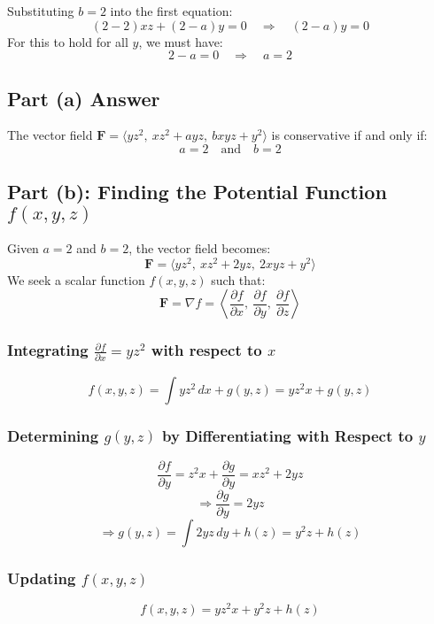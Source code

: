 \documentclass[11pt]{article}
\begin{document}
Substituting \( b = 2 \) into the first equation:
\[
(2 - 2) x z + (2 - a) y = 0 \quad \Rightarrow \quad (2 - a) y = 0
\]
For this to hold for all \( y \), we must have:
\[
2 - a = 0 \quad \Rightarrow \quad a = 2
\]

\newpage

\subsection{Part (a) Answer}

The vector field \( \mathbf{F} = \langle y z^2, \ x z^2 + a y z, \ b x y z + y^2 \rangle \) is conservative if and only if:
\[
\boxed{ a = 2 \quad \text{and} \quad b = 2 }
\]

\newpage

\subsection{Part (b): Finding the Potential Function \( f(x, y, z) \)}

Given \( a = 2 \) and \( b = 2 \), the vector field becomes:
\[
\mathbf{F} = \langle y z^2, \ x z^2 + 2 y z, \ 2 x y z + y^2 \rangle
\]
We seek a scalar function \( f(x, y, z) \) such that:
\[
\mathbf{F} = \nabla f = \left\langle \frac{\partial f}{\partial x}, \ \frac{\partial f}{\partial y}, \ \frac{\partial f}{\partial z} \right\rangle
\]

\subsubsection*{Integrating \( \frac{\partial f}{\partial x} = y z^2 \) with respect to \( x \)}
\[
f(x, y, z) = \int y z^2 \, dx + g(y, z) = y z^2 x + g(y, z)
\]

\subsubsection*{Determining \( g(y, z) \) by Differentiating with Respect to \( y \)}
\[
\frac{\partial f}{\partial y} = z^2 x + \frac{\partial g}{\partial y} = x z^2 + 2 y z
\]
\[
\Rightarrow \frac{\partial g}{\partial y} = 2 y z
\]
\[
\Rightarrow g(y, z) = \int 2 y z \, dy + h(z) = y^2 z + h(z)
\]

\subsubsection*{Updating \( f(x, y, z) \)}
\[
f(x, y, z) = y z^2 x + y^2 z + h(z)
\]
\end{document}
